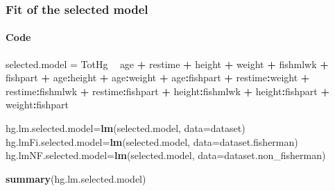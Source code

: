 \documentclass[12pt,]{article}
\newenvironment{Shaded}{\begin{snugshade}}{\end{snugshade}}
\newcommand{\KeywordTok}[1]{\textcolor[rgb]{0.13,0.29,0.53}{\textbf{#1}}}
\newcommand{\DataTypeTok}[1]{\textcolor[rgb]{0.13,0.29,0.53}{#1}}
\newcommand{\StringTok}[1]{\textcolor[rgb]{0.31,0.60,0.02}{#1}}
\newcommand{\OperatorTok}[1]{\textcolor[rgb]{0.81,0.36,0.00}{\textbf{#1}}}
\newcommand{\NormalTok}[1]{#1}
\let\oldparagraph\paragraph
\renewcommand{\paragraph}[1]{\oldparagraph{#1}\mbox{}}
\begin{document}
\subsubsection{Fit of the selected
model}\label{fit-of-the-selected-model}

\paragraph{Code}\label{code-5}

\begin{Shaded}
\begin{Highlighting}[]
\NormalTok{selected.model =}\StringTok{ }\NormalTok{TotHg }\OperatorTok{~}\StringTok{ }\NormalTok{age }\OperatorTok{+}\StringTok{ }\NormalTok{restime }\OperatorTok{+}\StringTok{ }\NormalTok{height }\OperatorTok{+}\StringTok{ }\NormalTok{weight }\OperatorTok{+}\StringTok{ }\NormalTok{fishmlwk }\OperatorTok{+}\StringTok{ }\NormalTok{fishpart }\OperatorTok{+}\StringTok{ }\NormalTok{age}\OperatorTok{:}\NormalTok{height }\OperatorTok{+}\StringTok{ }\NormalTok{age}\OperatorTok{:}\NormalTok{weight }\OperatorTok{+}\StringTok{ }\NormalTok{age}\OperatorTok{:}\NormalTok{fishpart }\OperatorTok{+}\StringTok{ }\NormalTok{restime}\OperatorTok{:}\NormalTok{weight }\OperatorTok{+}\StringTok{ }\NormalTok{restime}\OperatorTok{:}\NormalTok{fishmlwk }\OperatorTok{+}\StringTok{ }\NormalTok{restime}\OperatorTok{:}\NormalTok{fishpart }\OperatorTok{+}\StringTok{ }\NormalTok{height}\OperatorTok{:}\NormalTok{fishmlwk }\OperatorTok{+}\StringTok{ }\NormalTok{height}\OperatorTok{:}\NormalTok{fishpart }\OperatorTok{+}\StringTok{ }\NormalTok{weight}\OperatorTok{:}\NormalTok{fishpart}

\NormalTok{hg.lm.selected.model=}\KeywordTok{lm}\NormalTok{(selected.model, }\DataTypeTok{data=}\NormalTok{dataset)}
\NormalTok{hg.lmFi.selected.model=}\KeywordTok{lm}\NormalTok{(selected.model, }\DataTypeTok{data=}\NormalTok{dataset.fisherman)}
\NormalTok{hg.lmNF.selected.model=}\KeywordTok{lm}\NormalTok{(selected.model, }\DataTypeTok{data=}\NormalTok{dataset.non_fisherman)}

\KeywordTok{summary}\NormalTok{(hg.lm.selected.model)}
\end{Highlighting}
\end{Shaded}
\end{document}
